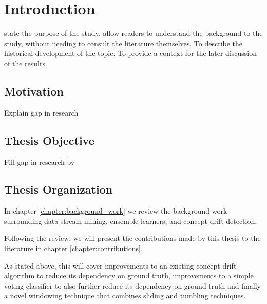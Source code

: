 
\chapter{Introduction\label{chapter:introduction}} %


\newcommand{\keyword}[1]{\textbf{#1}}
\newcommand{\tabhead}[1]{\textbf{#1}}
\newcommand{\code}[1]{\texttt{#1}}
\newcommand{\file}[1]{\texttt{\bfseries#1}}
\newcommand{\option}[1]{\texttt{\itshape#1}}

state the purpose of the study. 
allow readers to understand the background to the study, without needing to consult the literature themselves.
To describe the historical development of the topic.
To provide a context for the later discussion of the results.


\section{Motivation}
Explain gap in research

\section{Thesis Objective}
Fill gap in research by


\section{Thesis Organization}

In chapter \ref{chapter:background_work} we review the background work surrounding data stream mining, ensemble learners, and concept drift detection.

Following the review, we will present the contributions made by this thesis to the literature in chapter \ref{chapter:contributions}.

As stated above, this will cover improvements to an existing concept drift algorithm to reduce its dependency on ground truth, improvements to a simple voting classifier to also further reduce its dependency on ground truth and finally a novel windowing technique that combines sliding and tumbling techniques.

